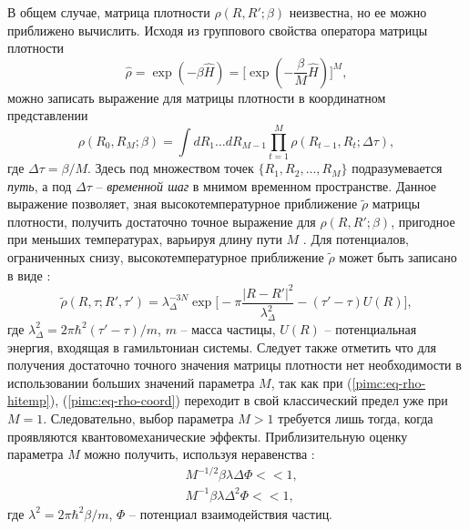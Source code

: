 В общем случае, матрица плотности $\rho(R,R';\beta)$ неизвестна, но ее можно приближено вычислить. Исходя из группового свойства оператора матрицы плотности 
\begin{equation*}
	\hat{\rho} = \exp(-\beta\hat{H}) = \Big[\exp(- \frac{\beta}{M}\hat{H})\Big]^M,
\end{equation*}
можно записать выражение для матрицы плотности в координатном представлении
\begin{equation} \label{pimc:eq-rho-coord}
	\rho(R_0, R_M; \beta) = \int dR_1 \dots dR_{M-1} \prod_{t=1}^M \rho(R_{t-1}, R_{t}; \Delta \tau),
\end{equation}
где $\Delta \tau = \beta / M$.
Здесь под множеством точек $\{R_1, R_2, \dots, R_M\}$ подразумевается \textit{путь}, а под $\Delta \tau$ -- \textit{временной шаг} в мнимом временном пространстве.
Данное выражение позволяет, зная высокотемпературное приближение $\tilde{\rho}$ матрицы плотности, получить достаточно точное выражение для $\rho(R,R'; \beta)$, 
пригодное при меньших температурах, варьируя длину пути $M$ \cite{Zamalin77}. 
Для потенциалов, ограниченных снизу, высокотемпературное приближение $\tilde{\rho}$ может быть записано в виде \cite{feiman2013}:  
\begin{equation}
	\label{pimc:eq-rho-hitemp}
	\tilde{\rho}(R, \tau; R', \tau') = \lambda_\Delta^{-3N} \exp \Big[ -\pi \frac{|R - R'|^2}{\lambda_\Delta^2} - (\tau' - \tau)U(R) \Big],
\end{equation}
где $\lambda_\Delta^2 = 2\pi \hbar^2 (\tau' - \tau)/m$, $m$ -- масса частицы, $U(R)$ -- потенциальная энергия, входящая в гамильтониан системы. 
Следует также отметить что для получения достаточно точного значения матрицы плотности нет необходимости в использовании больших значений параметра $M$, так как
при (\ref{pimc:eq-rho-hitemp}), (\ref{pimc:eq-rho-coord}) переходит в свой классический предел уже при $M=1$. Следовательно, выбор параметра $M>1$ требуется лишь тогда, когда проявляются квантовомеханические эффекты. Приблизительную оценку параметра $M$ можно получить, используя неравенства \cite{filinov1975}:
\begin{eqnarray*}
	& M^{-1/2}\beta \lambda \Delta \Phi <<  1, \\
	& M^{-1}\beta \lambda \Delta^2 \Phi << 1,
\end{eqnarray*}
где $\lambda^2 = 2\pi \hbar^2 \beta/m$, $\Phi$ -- потенциал взаимодействия частиц. 

